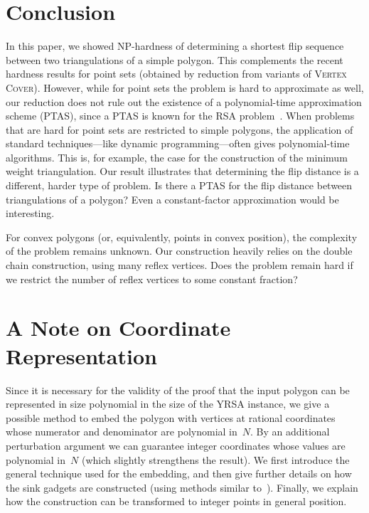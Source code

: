 \documentclass[a4paper,11pt]{article}
\begin{document}
\section{Conclusion}
In this paper, we showed NP-hardness of determining a shortest flip sequence between two triangulations of a simple polygon.
This complements the recent hardness results for point sets (obtained by reduction from variants of \textsc{Vertex Cover}).
However, while for point sets the problem is hard to approximate as well, our reduction does not rule out the existence of a polynomial-time approximation
scheme (PTAS), since a PTAS is known for the RSA problem~\cite{rsa_ptas}.
When problems that are hard for point sets are restricted to simple polygons, the application of standard techniques---like dynamic programming---often gives polynomial-time algorithms.
This is, for example, the case for the construction of the minimum weight triangulation.
Our result illustrates that determining the flip distance is a different, harder type of problem.
Is there a PTAS for the flip distance between triangulations of a polygon?
Even a constant-factor approximation would be interesting.

For convex polygons (or, equivalently, points in convex position), the complexity of the problem remains unknown.
Our construction heavily relies on the double chain construction, using many reflex vertices.
Does the problem remain hard if we restrict the number of reflex vertices to some constant fraction?





\newpage
\appendix


\section{A Note on Coordinate Representation}\label{apx_coordinates}
Since it is necessary for the validity of the proof that the input polygon can be represented in size polynomial in the size of the YRSA instance, we give a possible method to embed the polygon with vertices at rational coordinates whose numerator and denominator are polynomial in~$N$.
By an additional perturbation argument we can guarantee integer coordinates whose values are polynomial in~$N$ (which slightly strengthens the result).
We first introduce the general technique used for the embedding, and then give further details on how the sink gadgets are constructed (using methods similar to~\cite{point_set_hard}).
Finally, we explain how the construction can be transformed to integer points in general position.
\end{document}
